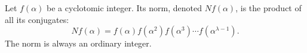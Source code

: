 Let $f(\alpha)$ be a cyclotomic integer. Its norm, denoted $Nf(\alpha)$, is the product of all its conjugates:
$$Nf(\alpha) = f(\alpha) f(\alpha^2) f(\alpha^3) \cdots f(\alpha^{\lambda-1}).$$
The norm is always an ordinary integer.
